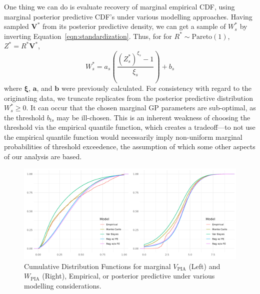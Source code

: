 One thing we can do is evaluate recovery of marginal empirical CDF, using marginal
    posterior predictive CDF's under various modelling approaches.
    Having sampled $\bm{V}^{*}$ from its posterior predictive density, we can get a sample of $W_s^*$
    by inverting Equation~\eqref{eqn:standardization}.  Thus, for for $R^*\sim\text{Pareto}(1)$, 
    $Z^* = R^*\bm{V}^*$,
    \begin{equation*}
        W_s^* = a_s\left(\frac{(Z_s^*)^{\xi_s} - 1}{\xi_s}\right) + b_s
    \end{equation*}
    where $\bm{\xi}$, $\bm{a}$, and $\bm{b}$ were previously calculated.  
    For consistency with regard to the originating data, we truncate replicates 
    from the posterior predictive distribution $W_{s}^* \geq 0$.  
    It can occur that the chosen marginal GP parameters are sub-optimal, as the threshold
    $b_{ts}$ may be ill-chosen.  This is an inherent weakness of choosing
    the threshold via the empirical quantile function, which creates a 
    tradeoff---to not use the empirical quantile function would necessarily imply 
    non-uniform marginal probabilities of threshold exceedence, the assumption of 
    which some other aspects of our analysis are based.

\begin{figure}[ht]
    \caption{Cumulative Distribution Functions for marginal $V_{\text{PIA}}$ (Left) and 
    $W_{\text{PIA}}$ (Right), Empirical, or posterior predictive under various modelling
    considerations.\label{Plot:marginal_doverafb}}
    \centering
    \includegraphics[width=\textwidth]{./plots/delaware_marginal_phil_ia.png}
\end{figure}
    


